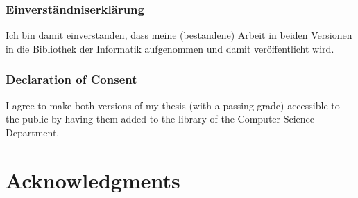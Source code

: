 \vspace{1cm}

\subsubsection*{Einverst{\"a}ndniserkl{\"a}rung}
Ich bin damit einverstanden, dass meine (bestandene) Arbeit in beiden Versionen in die
Bibliothek der Informatik aufgenommen und damit ver{\"o}ffentlicht wird.

\subsubsection*{Declaration of Consent}
I agree to make both versions of my thesis (with a passing grade) accessible to the public 
by having them added to the library of the Computer Science Department.

\vspace{3cm}

\par\noindent\makebox[2in]{\hrulefill} 		\hfill\makebox[2in]{\hrulefill}%
\par\noindent{}	\hfill{}%

\newpage
\section*{Acknowledgments}


\pagestyle{empty}
\setcounter{savepage}{\thepage}
\begin{abstractpage}
    
\end{abstractpage}

